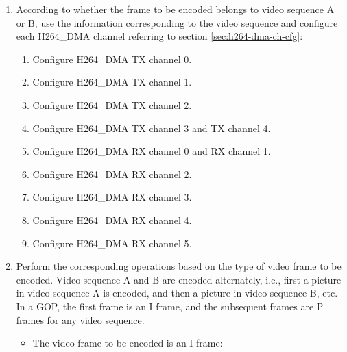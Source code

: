 \documentclass[main\_\_EN.tex]{subfiles}
\begin{document}
\begin{enumerate}
\begin{enumerate}
        \item To use the quantization result decimate function, configure its related registers referring to section \ref{sec:h264-decimate}.
        \item To use the MB level rate control function, configure its related registers referring to chapter \ref{sec:h264-rate-ctrl}.
        \item To use the ROI function, configure its related registers referring to chapter \ref{sec:h264-roi}.
        \item To use the MV merge function, configure its related registers referring to chapter \ref{sec:h264-mv-merge}.
    \end{enumerate}
    \item\label{item:h264-dual-dma} According to whether the frame to be encoded belongs to video sequence A or B, use the information corresponding to the video sequence and configure each H264\_DMA channel referring to section \ref{sec:h264-dma-ch-cfg}:
    \begin{enumerate}
        \item Configure H264\_DMA TX channel 0.
        \item Configure H264\_DMA TX channel 1.
        \item Configure H264\_DMA TX channel 2.
        \item Configure H264\_DMA TX channel 3 and TX channel 4.
        \item Configure H264\_DMA RX channel 0 and RX channel 1.
        \item Configure H264\_DMA RX channel 2.
        \item Configure H264\_DMA RX channel 3.
        \item Configure H264\_DMA RX channel 4.
        \item Configure H264\_DMA RX channel 5.
    \end{enumerate}
    \item\label{item:h264-dual-frame} Perform the corresponding operations based on the type of video frame to be encoded. Video sequence A and B are encoded alternately, i.e., first a picture in video sequence A is encoded, and then a picture in video sequence B, etc. In a GOP, the first frame is an I frame, and the subsequent frames are P frames for any video sequence.
    \begin{itemize}
        \item The video frame to be encoded is an I frame:
        \begin{enumerate}

\end{enumerate}
\end{itemize}
\end{enumerate}
\end{document}
